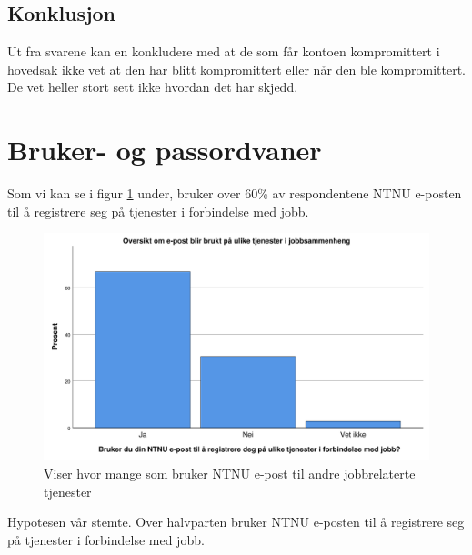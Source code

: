 \subsection{Konklusjon}
Ut fra svarene kan en konkludere med at de som får kontoen kompromittert i hovedsak ikke vet at den har blitt kompromittert eller når den ble kompromittert. De vet heller stort sett ikke hvordan det har skjedd. 

\section{Bruker- og passordvaner}
Som vi kan se i figur \ref{fig:epost-jobb} under, bruker over 60\% av respondentene NTNU e-posten til å registrere seg på tjenester i forbindelse med jobb.
\begin{figure}[H]
    \centering
    \includegraphics[scale=0.5]{case_2/bilder/spss/epost_jobb.pdf}
    \caption[epost-jobb]{Viser hvor mange som bruker NTNU e-post til andre jobbrelaterte tjenester}
    \label{fig:epost-jobb}
\end{figure}
Hypotesen vår stemte. Over halvparten bruker NTNU e-posten til å registrere seg på tjenester i forbindelse med jobb. 

